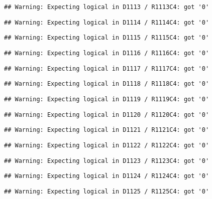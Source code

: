 \documentclass[
]{article}
\begin{document}
\begin{verbatim}
## Warning: Expecting logical in D1113 / R1113C4: got '0'
\end{verbatim}

\begin{verbatim}
## Warning: Expecting logical in D1114 / R1114C4: got '0'
\end{verbatim}

\begin{verbatim}
## Warning: Expecting logical in D1115 / R1115C4: got '0'
\end{verbatim}

\begin{verbatim}
## Warning: Expecting logical in D1116 / R1116C4: got '0'
\end{verbatim}

\begin{verbatim}
## Warning: Expecting logical in D1117 / R1117C4: got '0'
\end{verbatim}

\begin{verbatim}
## Warning: Expecting logical in D1118 / R1118C4: got '0'
\end{verbatim}

\begin{verbatim}
## Warning: Expecting logical in D1119 / R1119C4: got '0'
\end{verbatim}

\begin{verbatim}
## Warning: Expecting logical in D1120 / R1120C4: got '0'
\end{verbatim}

\begin{verbatim}
## Warning: Expecting logical in D1121 / R1121C4: got '0'
\end{verbatim}

\begin{verbatim}
## Warning: Expecting logical in D1122 / R1122C4: got '0'
\end{verbatim}

\begin{verbatim}
## Warning: Expecting logical in D1123 / R1123C4: got '0'
\end{verbatim}

\begin{verbatim}
## Warning: Expecting logical in D1124 / R1124C4: got '0'
\end{verbatim}

\begin{verbatim}
## Warning: Expecting logical in D1125 / R1125C4: got '0'
\end{verbatim}
\end{document}
